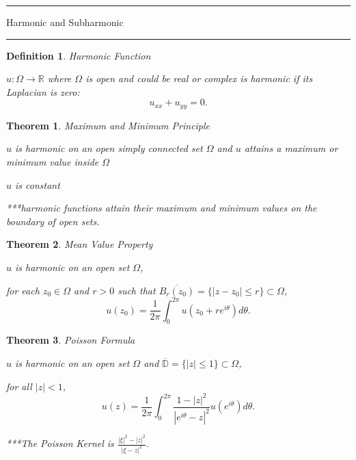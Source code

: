 \documentclass[12pt]{Qual}
\newtheorem{theorem}{Theorem}
\newtheorem{definition}{Definition}
\begin{document}
\begin{center}
\noindent\textcolor{blue!60!black}{\rule{15cm}{1mm}}
\Huge \faBug\faPuzzlePiece\faCoffee Harmonic and Subharmonic \faCoffee\faPuzzlePiece\faBug
\vspace{-0.5cm}
\noindent\textcolor{blue!60!black}{\rule{15cm}{1mm}}
\end{center}
\vspace{0.5cm}
\begin{definition}{\Large\textit{Harmonic Function}}

$u:\Omega\to\mathbb{R}$ where $\Omega$ is open and could be real or complex is harmonic if its Laplacian is zero: $$u_{xx}+u_{yy}=0.$$

\end{definition}
\vspace{0.5cm}
\begin{theorem}{\Large\textit{Maximum and Minimum Principle}}

\begin{minipage}{0.85\textwidth}
\vspace{0.45cm}
$u$ is harmonic on an open simply connected set $\Omega$ and $u$ attains a maximum \textit{or} minimum value inside $\Omega$
\end{minipage}


 $u$ is constant

***harmonic functions attain their maximum \textit{and} minimum values on the boundary of open sets.
\end{theorem}
\vspace{0.5cm}
\begin{theorem}{\Large\textit{Mean Value Property}}

 $u$ is harmonic on an open set $\Omega$,

 for each $z_0\in\Omega$ and $r>0$ such that $\overline{B_r(z_0)}=\{|z-z_0|\le r\}\subset\Omega$, $$u(z_0)=\frac{1}{2\pi}\int_0^{2\pi}u(z_0+re^{i\theta})d\theta.$$

\end{theorem}
\vspace{0.5cm}
\begin{theorem}{\Large\textit{Poisson Formula}}

 $u$ is harmonic on an open set $\Omega$ and $\overline{\mathbb{D}}=\{|z|\le1\}\subset\Omega$,

 for all $|z|<1$, $$u(z)=\frac{1}{2\pi}\int_0^{2\pi}\frac{1-|z|^2}{|e^{i\theta}-z|^2}u(e^{i\theta})d\theta.$$

***The Poisson Kernel is $\displaystyle\frac{|\xi|^2-|z|^2}{|\xi-z|^2}$.

\end{theorem}
\end{document}
